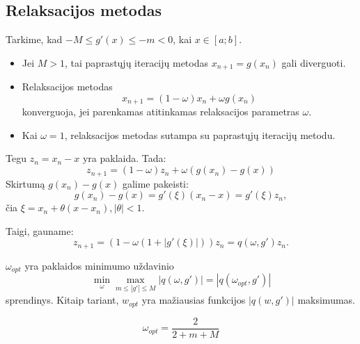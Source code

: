 \subsection{Relaksacijos metodas}

\cite[34-35]{textbook}

Tarkime, kad $-M \leq g'(x) \leq -m < 0$, kai $x \in \left[ a; b \right]$.
\begin{itemize}
  \item Jei $M > 1$, tai paprastųjų iteracijų metodas $x_{n+1} = g(x_{n})$
    gali diverguoti.
  \item Relaksacijos metodas
    \begin{equation*}
      x_{n+1} = (1 - \omega)x_{n} + \omega g(x_{n})
    \end{equation*}
    konverguoja, jei parenkamas atitinkamas relaksacijos parametras
    $\omega$.
  \item Kai $\omega = 1$, relaksacijos metodas sutampa su paprastųjų
    iteracijų metodu.
\end{itemize}

Tegu $z_{n} = x_{n} - x$ yra paklaida. Tada:
\begin{equation*}
  z_{n+1} = (1 - \omega)z_n + \omega(g(x_n) - g(x))
\end{equation*}
Skirtumą $g(x_n) - g(x)$ galime pakeisti:
\begin{equation*}
  g(x_n) - g(x) = g'(\xi)(x_{n} - x) = g'(\xi)z_{n},
\end{equation*}
čia $\xi = x_{n} + \theta(x - x_n), |\theta| < 1$.

Taigi, gauname:
\begin{equation*}
  z_{n+1} = (1 - \omega(1 + |g'(\xi)|))z_{n} = q(\omega, g')z_{n}.
\end{equation*}

$\omega_{opt}$ yra paklaidos minimumo uždavinio
\begin{equation*}
  \min_{\omega} \max_{m \leq |g'| \leq M} |q(\omega, g')|
    = |q(\omega_{opt}, g')|
\end{equation*}
sprendinys. Kitaip tariant, $w_{opt}$ yra mažiausias funkcijos
$|q(w,g')|$ maksimumas.

\begin{equation*}
  \omega_{opt} = \frac{2}{2 + m + M}
\end{equation*}

